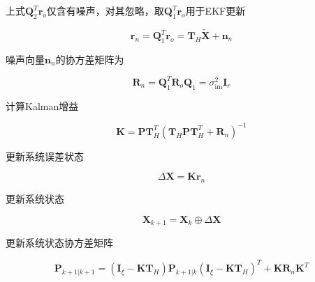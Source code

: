 \documentclass[12pt,a4paper]{article}
\begin{document}
上式${\mathbf{Q}_{2}^{T} \mathbf{r}_{o}}$仅含有噪声，对其忽略，取$\mathbf{Q}_{1}^{T} \mathbf{r}_{o}$用于EKF更新

\begin{equation}
\mathbf{r}_{n}=\mathbf{Q}_{1}^{T} \mathbf{r}_{o}=\mathbf{T}_{H} \widetilde{\mathbf{X}}+\mathbf{n}_{n}
\end{equation}

噪声向量$\mathbf{n}_{n}$的协方差矩阵为

\begin{equation}
\mathbf{R}_{n}=
\mathbf{Q}_{1}^{T} \mathbf{R}_{o} \mathbf{Q}_{1}=\sigma_{\mathrm{im}}^{2} \mathbf{I}_{r}
\end{equation}

计算Kalman增益

\begin{equation}
\mathbf{K}=\mathbf{P} \mathbf{T}_{H}^{T}\left(\mathbf{T}_{H} \mathbf{P} \mathbf{T}_{H}^{T}+\mathbf{R}_{n}\right)^{-1}
\end{equation}

更新系统误差状态

\begin{equation}
\Delta \mathbf{X}=\mathbf{K r}_{n}
\end{equation}

更新系统状态

\begin{equation}
\mathbf{X}_{k+1} = \mathbf{X}_k \oplus \Delta \mathbf{X}
\end{equation}

更新系统状态协方差矩阵

\begin{equation}
\mathbf{P}_{k+1 | k+1}=\left(\mathbf{I}_{\xi}-\mathbf{K} \mathbf{T}_{H}\right) \mathbf{P}_{k+1 | k}\left(\mathbf{I}_{\xi}-\mathbf{K} \mathbf{T}_{H}\right)^{T}+\mathbf{K} \mathbf{R}_{n} \mathbf{K}^{T}
\end{equation}

\newpage


\end{document}
